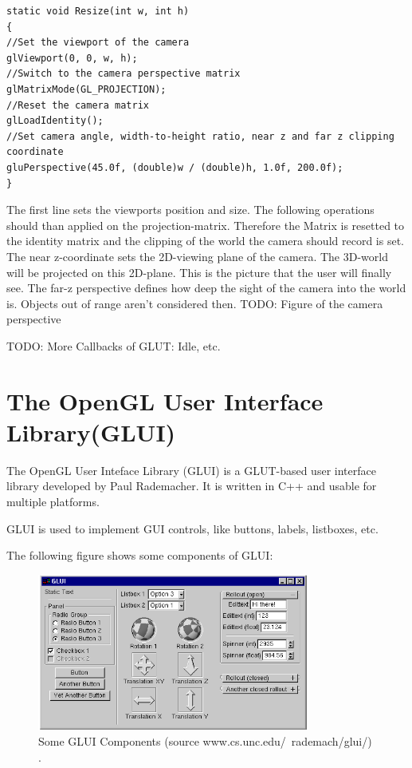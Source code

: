 \documentclass[10pt,a4paper,DIV=11]{scrreprt}
\begin{document}
\begin{lstlisting}[caption={Resize camera perspective on window resize},label=lst:glut-resize]
static void Resize(int w, int h)
{
//Set the viewport of the camera
glViewport(0, 0, w, h);
//Switch to the camera perspective matrix
glMatrixMode(GL_PROJECTION); 
//Reset the camera matrix
glLoadIdentity();
//Set camera angle, width-to-height ratio, near z and far z clipping coordinate
gluPerspective(45.0f, (double)w / (double)h, 1.0f, 200.0f);
}
\end{lstlisting}

The first line sets the viewports position and size. The following operations should than applied on the projection-matrix. Therefore the Matrix is resetted to the identity matrix and the clipping of the world the camera should record is set. The near z-coordinate sets the 2D-viewing plane of the camera. The 3D-world will be projected on this 2D-plane. This is the picture that the user will finally see. The far-z perspective defines how deep the sight of the camera into the world is. Objects out of range aren't considered then.
TODO: Figure of the camera perspective

TODO: More Callbacks of GLUT: Idle, etc.

\section{The OpenGL User Interface Library(GLUI)}
The OpenGL User Inteface Library (GLUI) is a GLUT-based user interface library developed by Paul Rademacher. It is written in C++ and usable for multiple platforms.

GLUI is used to implement GUI controls, like buttons, labels, listboxes, etc.

The following figure shows some components of GLUI:

\begin{center}
	\begin{figure}[H]
		\centering
		\includegraphics[width=0.8\textwidth,scale=1.0]{files/glui.png}  
		\caption{Some GLUI Components (source www.cs.unc.edu/~rademach/glui/) \cite{ogl-glui}.}
		\label{fig:ogl-glui}
	\end{figure}
\end{center}
\end{document}
